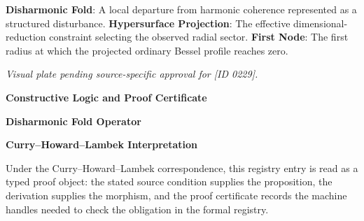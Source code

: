 
\noindent \textbf{Disharmonic Fold}: A local departure from harmonic coherence represented as a structured disturbance. \enspace\textbullet\enspace \textbf{Hypersurface Projection}: The effective dimensional-reduction constraint selecting the observed radial sector. \enspace\textbullet\enspace \textbf{First Node}: The first radius at which the projected ordinary Bessel profile reaches zero.\par

\endgroup

\begingroup\footnotesize\itshape
Visual plate pending source-specific approval for [ID 0229].
\par\endgroup

\clearpage
\begingroup\tzpsupportsetup
\noindent\textbf{\fontsize{10.8pt}{12.8pt}\selectfont [ID 0229] Constructive Logic and Proof Certificate}\par
\noindent\textbf{\fontsize{10pt}{12pt}\selectfont Disharmonic Fold Operator}\par
\vspace{0.45em}
\begingroup
\footnotesize
\setlength{\parskip}{0.22em}
\setlength{\parindent}{0pt}
\noindent\textbf{Curry--Howard--Lambek Interpretation}\par
Under the Curry--Howard--Lambek correspondence, this registry entry is read as a typed proof
object: the stated source condition supplies the proposition, the derivation supplies the
morphism, and the proof certificate records the machine handles needed to check the obligation
in the formal registry.

